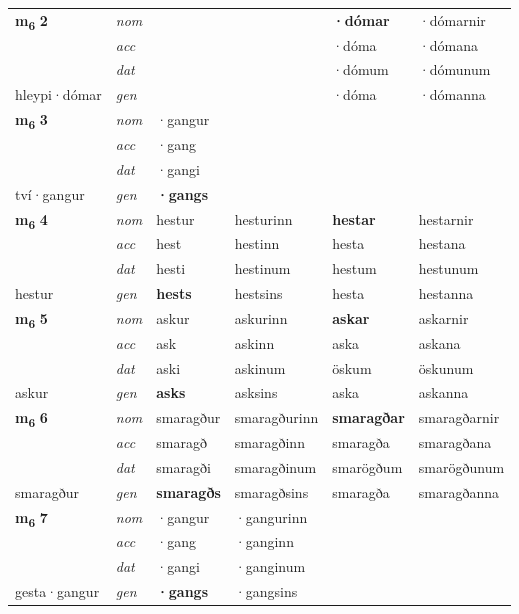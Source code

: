 \begin{longtable}[l]{X>{\footnotesize\itshape}XXXXX}
\multirow{3}{*}{{{\textbf{m{\textsubscript{6}}} \Large{\textbf{2}}}}} & nom &  &  & \textbf{·dómar} & ·dómarnir \\*
 & acc &  &  & ·dóma & ·dómana \\*
 & dat &  &  & ·dómum & ·dómunum \\*
 {\footnotesize{hleypi\allowbreak ·dómar}} & gen & \textbf{} &  & ·dóma & ·dómanna \\
\midrule

\multirow{3}{*}{{{\textbf{m{\textsubscript{6}}} \Large{\textbf{3}}}}} & nom & ·gangur &  & \textbf{} &  \\*
 & acc & ·gang &  &  &  \\*
 & dat & ·gangi &  &  &  \\*
 {\footnotesize{tví\allowbreak ·gangur}} & gen & \textbf{·gangs} &  &  &  \\
\midrule

\multirow{3}{*}{{{\textbf{m{\textsubscript{6}}} \Large{\textbf{4}}}}} & nom & hestur & hesturinn & \textbf{hestar} & hestarnir \\*
 & acc & hest & hestinn & hesta & hestana \\*
 & dat & hesti & hestinum & hestum & hestunum \\*
 {\footnotesize{hestur}} & gen & \textbf{hests} & hestsins & hesta & hestanna \\
\midrule

\multirow{3}{*}{{{\textbf{m{\textsubscript{6}}} \Large{\textbf{5}}}}} & nom & askur & askurinn & \textbf{askar} & askarnir \\*
 & acc & ask & askinn & aska & askana \\*
 & dat & aski & askinum & öskum & öskunum \\*
 {\footnotesize{askur}} & gen & \textbf{asks} & asksins & aska & askanna \\
\midrule

\multirow{3}{*}{{{\textbf{m{\textsubscript{6}}} \Large{\textbf{6}}}}} & nom & smaragður & smaragðurinn & \textbf{smaragðar} & smaragðarnir \\*
 & acc & smaragð & smaragðinn & smaragða & smaragðana \\*
 & dat & smaragði & smaragðinum & smarögðum & smarögðunum \\*
 {\footnotesize{smaragður}} & gen & \textbf{smaragðs} & smaragðsins & smaragða & smaragðanna \\
\midrule

\multirow{3}{*}{{{\textbf{m{\textsubscript{6}}} \Large{\textbf{7}}}}} & nom & ·gangur & ·gangurinn & \textbf{} &  \\*
 & acc & ·gang & ·ganginn &  &  \\*
 & dat & ·gangi & ·ganginum &  &  \\*
 {\footnotesize{gesta\allowbreak ·gangur}} & gen & \textbf{·gangs} & ·gangsins &  &  \\
\midrule


\end{longtable}
